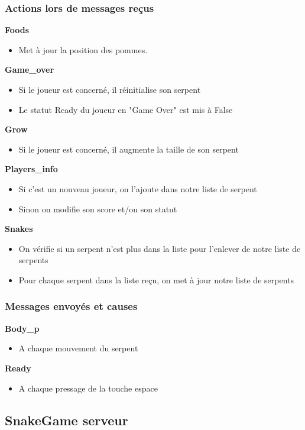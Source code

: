 \documentclass[a4paper]{article}
\begin{document}
\subsubsection{Actions lors de messages reçus}
\textbf{Foods}
\begin{itemize}
\item Met à jour la position des pommes.
\end{itemize}
\textbf{Game\_over}
\begin{itemize}
\item Si le joueur est concerné, il réinitialise son serpent
\item Le statut Ready du joueur en "Game Over" est mis à False
\end{itemize}
\textbf{Grow}
\begin{itemize}
    \item Si le joueur est concerné, il augmente la taille de son serpent
\end{itemize}
\textbf{Players\_info}
\begin{itemize}
    \item Si c'est un nouveau joueur, on l'ajoute dans notre liste de serpent
    \item Sinon on modifie son score et/ou son statut
\end{itemize}
\textbf{Snakes}
\begin{itemize}
    \item On vérifie si un serpent n'est plus dans la liste pour l'enlever de notre liste de serpents
    \item Pour chaque serpent dans la liste reçu, on met à jour notre liste de serpents
\end{itemize}
\subsubsection{Messages envoyés et causes}
\textbf{Body\_p}
\begin{itemize}
\item A chaque mouvement du serpent
\end{itemize}

\textbf{Ready}
\begin{itemize}
\item A chaque pressage de la touche espace
\end{itemize}

\subsection{SnakeGame serveur}
\end{document}
